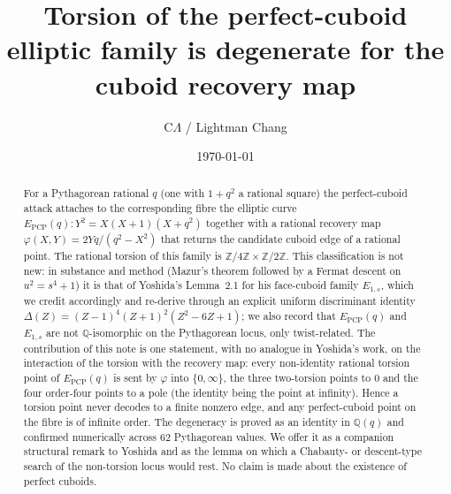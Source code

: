 \documentclass[11pt,reqno]{amsart}
\theoremstyle{plain}
\theoremstyle{definition}
\newcommand{\Q}{\mathbb{Q}}
\newcommand{\Z}{\mathbb{Z}}
\newcommand{\Epcp}{E_{\mathrm{PCP}}}
\begin{document}
\title[Degeneracy of torsion under the cuboid recovery map]{Torsion of the perfect-cuboid elliptic family is degenerate
for the cuboid recovery map}

\author{C$\Lambda$ / Lightman Chang}
\address{Independent Researcher}

\date{\today}



\begin{abstract}
For a Pythagorean rational $q$ (one with $1+q^{2}$ a rational square) the
perfect-cuboid attack attaches to the corresponding fibre the elliptic curve
$\Epcp(q)\colon Y^{2}=X(X+1)(X+q^{2})$ together with a rational recovery map
$\varphi(X,Y)=2Yq/(q^{2}-X^{2})$ that returns the candidate cuboid edge of a rational
point. The rational torsion of this family is $\Z/4\Z\times\Z/2\Z$. This
classification is not new: in substance and method (Mazur's theorem followed by a Fermat
descent on $u^{2}=s^{4}+1$) it is that of Yoshida's Lemma~2.1 for his face-cuboid family
$E_{1,s}$, which we credit accordingly and re-derive through an explicit uniform
discriminant identity $\Delta(Z)=(Z-1)^{4}(Z+1)^{2}(Z^{2}-6Z+1)$; we also record that
$\Epcp(q)$ and $E_{1,s}$ are not $\Q$-isomorphic on the Pythagorean locus, only
twist-related. The contribution of this note is one statement, with no analogue in
Yoshida's work, on the interaction of the torsion with the recovery map: every
non-identity rational torsion point of $\Epcp(q)$ is sent by $\varphi$ into
$\{0,\infty\}$, the three two-torsion points to $0$ and the four order-four points to a
pole (the identity being the point at infinity). Hence a torsion
point never decodes to a finite nonzero edge, and any perfect-cuboid point on the fibre
is of infinite order. The degeneracy is proved as an identity in $\Q(q)$ and confirmed
numerically across $62$ Pythagorean values. We offer it as a companion structural remark
to Yoshida and as the lemma on which a Chabauty- or descent-type search of the
non-torsion locus would rest. No claim is made about the existence of perfect cuboids.
\end{abstract}

\maketitle
\end{document}
